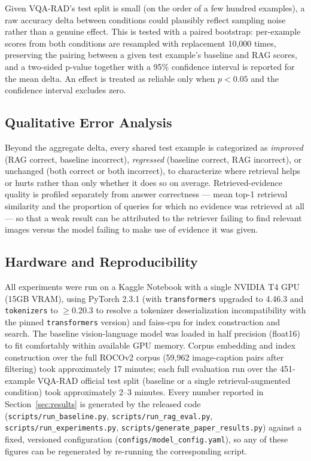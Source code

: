 Given VQA-RAD's test split is small (on the order of a few hundred
examples), a raw accuracy delta between conditions could plausibly reflect
sampling noise rather than a genuine effect. This is tested with a paired
bootstrap: per-example scores from both conditions are resampled with
replacement 10{,}000 times, preserving the pairing between a given test
example's baseline and RAG scores, and a two-sided p-value together with a
95\% confidence interval is reported for the mean delta. An effect is
treated as reliable only when $p < 0.05$ and the confidence interval
excludes zero.

\subsection{Qualitative Error Analysis}

Beyond the aggregate delta, every shared test example is categorized as
\emph{improved} (RAG correct, baseline incorrect), \emph{regressed}
(baseline correct, RAG incorrect), or unchanged (both correct or both
incorrect), to characterize where retrieval helps or hurts rather than only
whether it does so on average. Retrieved-evidence quality is profiled
separately from answer correctness --- mean top-1 retrieval similarity and
the proportion of queries for which no evidence was retrieved at all --- so
that a weak result can be attributed to the retriever failing to find
relevant images versus the model failing to make use of evidence it was
given.

\subsection{Hardware and Reproducibility}

All experiments were run on a Kaggle Notebook with a single NVIDIA T4 GPU
(15GB VRAM), using PyTorch 2.3.1 (with \texttt{transformers} upgraded to
4.46.3 and \texttt{tokenizers} to $\geq$0.20.3 to resolve a tokenizer
deserialization incompatibility with the pinned \texttt{transformers}
version) and faiss-cpu for index construction and search. The baseline
vision-language model was loaded in half precision (float16) to fit
comfortably within available GPU memory. Corpus embedding and index
construction over the full ROCOv2 corpus (59{,}962 image-caption pairs
after filtering) took approximately 17 minutes; each full evaluation run
over the 451-example VQA-RAD official test split (baseline or a single
retrieval-augmented condition) took approximately 2--3 minutes. Every
number reported in Section~\ref{sec:results} is generated by the released
code (\texttt{scripts/run\_baseline.py}, \texttt{scripts/run\_rag\_eval.py},
\texttt{scripts/run\_experiments.py},
\texttt{scripts/generate\_paper\_results.py}) against a fixed, versioned
configuration (\texttt{configs/model\_config.yaml}), so any of these
figures can be regenerated by re-running the corresponding script.
